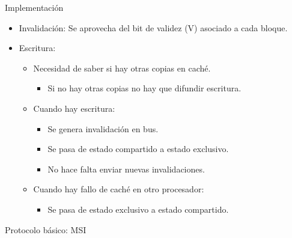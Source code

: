 \documentclass[12pt, twoside, openright]{report} %
\begin{document}
    Implementación

    \begin{itemize}
    
    \item
      Invalidación: Se aprovecha del bit de validez (V) asociado a
      cada bloque.
    \item
      Escritura:

      \begin{itemize}
      
      \item
        Necesidad de saber si hay otras copias en caché.

        \begin{itemize}
        
        \item
          Si no hay otras copias no hay que difundir escritura.
        \end{itemize}
      \item
        Cuando hay escritura:

        \begin{itemize}
        
        \item
          Se genera invalidación en bus.
        \item
          Se pasa de estado compartido a estado exclusivo.
        \item
          No hace falta enviar nuevas invalidaciones.
        \end{itemize}
      \item
        Cuando hay fallo de caché en otro procesador:

        \begin{itemize}
        
        \item
          Se pasa de estado exclusivo a estado compartido.
        \end{itemize}
      \end{itemize}
    \end{itemize}

    Protocolo básico: MSI
\end{document}
